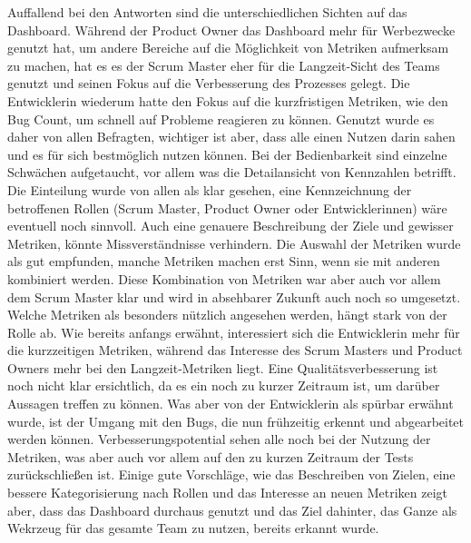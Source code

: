 Auffallend bei den Antworten sind die unterschiedlichen Sichten auf das Dashboard.
Während der Product Owner das Dashboard mehr für Werbezwecke genutzt hat, um andere Bereiche auf die Möglichkeit von Metriken aufmerksam zu machen, hat es es der Scrum Master eher für die Langzeit-Sicht des Teams genutzt und seinen Fokus auf die Verbesserung des Prozesses gelegt.
Die Entwicklerin wiederum hatte den Fokus auf die kurzfristigen Metriken, wie den Bug Count, um schnell auf Probleme reagieren zu können.
Genutzt wurde es daher von allen Befragten, wichtiger ist aber, dass alle einen Nutzen darin sahen und es für sich bestmöglich nutzen können.
Bei der Bedienbarkeit sind einzelne Schwächen aufgetaucht, vor allem was die Detailansicht von Kennzahlen betrifft.
Die Einteilung wurde von allen als klar gesehen, eine Kennzeichnung der betroffenen Rollen (Scrum Master, Product Owner oder Entwicklerinnen) wäre eventuell noch sinnvoll.
Auch eine genauere Beschreibung der Ziele und gewisser Metriken, könnte Missverständnisse verhindern.
Die Auswahl der Metriken wurde als gut empfunden, manche Metriken machen erst Sinn, wenn sie mit anderen kombiniert werden.
Diese Kombination von Metriken war aber auch vor allem dem Scrum Master klar und wird in absehbarer Zukunft auch noch so umgesetzt.
Welche Metriken als besonders nützlich angesehen werden, hängt stark von der Rolle ab.
Wie bereits anfangs erwähnt, interessiert sich die Entwicklerin mehr für die kurzzeitigen Metriken, während das Interesse des Scrum Masters und Product Owners mehr bei den Langzeit-Metriken liegt.
Eine Qualitätsverbesserung ist noch nicht klar ersichtlich, da es ein noch zu kurzer Zeitraum ist, um darüber Aussagen treffen zu können.
Was aber von der Entwicklerin als spürbar erwähnt wurde, ist der Umgang mit den Bugs, die nun frühzeitig erkennt und abgearbeitet werden können.
Verbesserungspotential sehen alle noch bei der Nutzung der Metriken, was aber auch vor allem auf den zu kurzen Zeitraum der Tests zurückschließen ist.
Einige gute Vorschläge, wie das Beschreiben von Zielen, eine bessere Kategorisierung nach Rollen und das Interesse an neuen Metriken zeigt aber, dass das Dashboard durchaus genutzt und das Ziel dahinter, das Ganze als Wekrzeug für das gesamte Team zu nutzen, bereits erkannt wurde.

